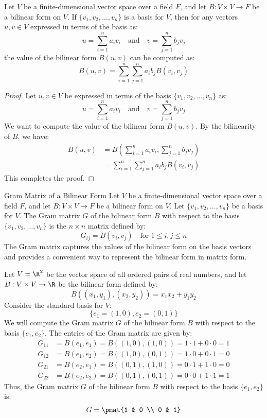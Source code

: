 \documentclass[openany]{book}
\begin{document}
\begin{mytheorem}
Let $V$ be a finite-dimensional vector space over a field $F$, and let $B: V \times V \to F$ be a bilinear form on $V$. If $\{v_1, v_2, \ldots, v_n\}$ is a basis for $V$, then for any vectors $u, v \in V$ expressed in terms of the basis as:
$$u = \sum_{i=1}^n a_i v_i \quad \text{and} \quad v = \sum_{j=1}^n b_j v_j$$
the value of the bilinear form $B(u, v)$ can be computed as:
$$B(u, v) = \sum_{i=1}^n \sum_{j=1}^n a_i b_j B(v_i, v_j)$$
\end{mytheorem}
\begin{proof}
Let $u, v \in V$ be expressed in terms of the basis $\{v_1, v_2, \ldots, v_n\}$ as:
$$u = \sum_{i=1}^n a_i v_i \quad \text{and} \quad v = \sum_{j=1}^n b_j v_j$$
We want to compute the value of the bilinear form $B(u, v)$. By the bilinearity of $B$, we have:
\[\begin{aligned}
B(u, v) &= B\left(\sum_{i=1}^n a_i v_i, \sum_{j=1}^n b_j v_j\right) \\
&= \sum_{i=1}^n \sum_{j=1}^n a_i b_j B(v_i, v_j)
\end{aligned}\]
This completes the proof.
\end{proof}
\begin{mydefinition}{Gram Matrix of a Bilinear Form}
Let $V$ be a finite-dimensional vector space over a field $F$, and let $B: V \times V \to F$ be a bilinear form on $V$. Let $\{v_1, v_2, \ldots, v_n\}$ be a basis for $V$. The Gram matrix $G$ of the bilinear form $B$ with respect to the basis $\{v_1, v_2, \ldots, v_n\}$ is the $n \times n$ matrix defined by:
$$G_{ij} = B(v_i, v_j) \quad \text{for } 1 \leq i, j \leq n$$
The Gram matrix captures the values of the bilinear form on the basis vectors and provides a convenient way to represent the bilinear form in matrix form.
\end{mydefinition}
\begin{example}
Let $V = \R^2$ be the vector space of all ordered pairs of real numbers, and let $B: V \times V \to \R$ be the bilinear form defined by:
$$B((x_1, y_1), (x_2, y_2)) = x_1x_2 + y_1y_2$$
Consider the standard basis for $V$:
$$\{e_1 = (1, 0), e_2 = (0, 1)\}$$
We will compute the Gram matrix $G$ of the bilinear form $B$ with respect to the basis $\{e_1, e_2\}$. The entries of the Gram matrix are given by:
\[\begin{aligned}
G_{11} &= B(e_1, e_1) = B((1, 0), (1, 0)) = 1 \cdot 1 + 0 \cdot 0 = 1 \\
G_{12} &= B(e_1, e_2) = B((1, 0), (0, 1)) = 1 \cdot 0 + 0 \cdot 1 = 0 \\
G_{21} &= B(e_2, e_1) = B((0, 1), (1, 0)) = 0 \cdot 1 + 1 \cdot 0 = 0 \\
G_{22} &= B(e_2, e_2) = B((0, 1), (0, 1)) = 0 \cdot 0 + 1 \cdot 1 = 1
\end{aligned}\]
Thus, the Gram matrix $G$ of the bilinear form $B$ with respect to the basis $\{e_1, e_2\}$ is:
$$G = \pmat{1 & 0 \\ 0 & 1}$$
\end{example}
\end{document}
